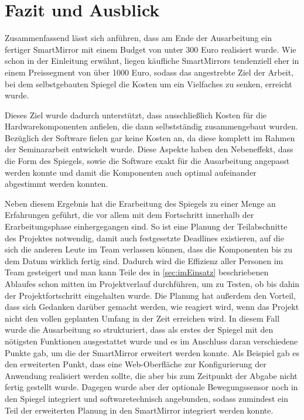\section{Fazit und Ausblick}

Zusammenfassend lässt sich anführen, dass am Ende der Ausarbeitung ein fertiger SmartMirror mit einem Budget von unter 300 Euro realisiert wurde. 
Wie schon in der Einleitung erwähnt, liegen käufliche SmartMirrors tendenziell eher in einem Preissegment von über 1000 Euro, sodass das angestrebte Ziel der Arbeit, bei dem selbstgebauten Spiegel die Kosten um ein Vielfaches zu senken, erreicht wurde.

Dieses Ziel wurde dadurch unterstützt, dass ausschließlich Kosten für die Hardwarekomponenten anfielen, die dann selbstständig zusammengebaut wurden. Bezüglich der Software fielen gar keine Kosten an, da diese komplett im Rahmen der Seminararbeit entwickelt wurde.
Diese Aspekte haben den Nebeneffekt, dass die Form des Spiegels, sowie die Software exakt für die Ausarbeitung angepasst werden konnte und damit die Komponenten auch optimal aufeinander abgestimmt werden konnten.

Neben diesem Ergebnis hat die Erarbeitung des Spiegels zu einer Menge an Erfahrungen geführt, die vor allem mit dem Fortschritt innerhalb der Erarbeitungsphase einhergegangen sind.
So ist eine Planung der Teilabschnitte des Projektes notwendig, damit auch festgesetzte Deadlines existieren, auf die sich die anderen Leute im Team verlassen können, dass die Komponenten bis zu dem Datum wirklich fertig sind. Dadurch wird die Effizienz aller Personen im Team gesteigert und man kann Teile des in \autoref{sec:imEinsatz} beschriebenen Ablaufes schon mitten im Projektverlauf durchführen, um zu Testen, ob bis dahin der Projektfortschritt eingehalten wurde. 
Die Planung hat außerdem den Vorteil, dass sich  Gedanken darüber gemacht werden, wie reagiert wird, wenn das Projekt nicht den vollen geplanten Umfang in der Zeit erreichen wird. In diesem Fall wurde die Ausarbeitung so strukturiert, dass als erstes der Spiegel mit den nötigsten Funktionen ausgestattet wurde und es im Anschluss daran verschiedene Punkte gab, um die der SmartMirror erweitert werden konnte. Als Beispiel gab es den erweiterten Punkt, dass eine Web-Oberfläche zur Konfigurierung der Anwendung realisiert werden sollte, die aber bis zum Zeitpunkt der Abgabe nicht fertig gestellt wurde. Dagegen wurde aber der optionale Bewegungssensor noch in den Spiegel integriert und softwaretechnisch angebunden, sodass zumindest ein Teil der erweiterten Planung in den SmartMirror integriert werden konnte.

